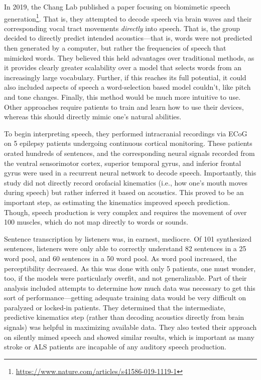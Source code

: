 In 2019, the Chang Lab published a paper focusing on biomimetic speech generation\footnote{\url{https://www.nature.com/articles/s41586-019-1119-1}}. That is, they attempted to decode speech via brain waves and their corresponding vocal tract movements \textit{directly} into speech. That is, the group decided to directly predict intended acoustics---that is, words were not predicted then generated by a computer, but rather the frequencies of speech that mimicked words. They believed this held advantages over traditional methods, as it provides clearly greater scalability over a model that selects words from an increasingly large vocabulary. Further, if this reaches its full potential, it could also included aspects of speech a word-selection based model couldn't, like pitch and tone changes. Finally, this method would be much more intuitive to use. Other approaches require patients to train and learn how to use their devices, whereas this should directly mimic one's natural abilities. \newline

To begin interpreting speech, they performed intracranial recordings via ECoG on 5 epilepsy patients undergoing continuous cortical monitoring. These patients orated hundreds of sentences, and the corresponding neural signals recorded from the ventral sensorimotor cortex, superior temporal gyrus, and inferior frontal gyrus were used in a recurrent neural network to decode speech. Importantly, this study did not directly record orofacial kinematics (i.e., how one's mouth moves during speech) but rather inferred it based on acoustics. This proved to be an important step, as estimating the kinematics improved speech prediction. Though, speech production is very complex and requires the movement of over 100 muscles, which do not map directly to words or sounds. \newline

Sentence transcription by listeners was, in earnest, mediocre. Of 101 synthesized sentences, listeners were only able to correctly understand 82 sentences in a 25 word pool, and 60 sentences in a 50 word pool. As word pool increased, the perceptibility decreased. As this was done with only 5 patients, one must wonder, too, if the models were particularly overfit, and not generalizable. Part of their analysis included attempts to determine how much data was necessary to get this sort of performance---getting adequate training data would be very difficult on paralyzed or locked-in patients. They determined that the intermediate, predictive kinematics step (rather than decoding acoustics directly from brain signals) was helpful in maximizing available data. They also tested their approach on silently mimed speech and showed similar results, which is important as many stroke or ALS patients are incapable of any auditory speech production. 

